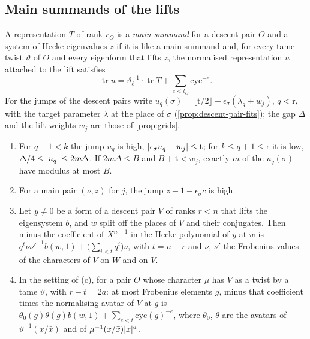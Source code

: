 \subsection{Main summands of the lifts}\label{ss:main-summands-lifts}
A representation $T$ of rank $r_O$ is a \emph{main summand} for a descent pair $O$ and a system of Hecke eigenvalues $z$ if it is like a main summand and, for every tame twist $\vartheta$ of $O$ and every eigenform that lifts
$z$, the normalised representation $u$ attached to the lift satisfies
\[
  \operatorname{tr}u=\vartheta^{-1}_\ell\cdot\operatorname{tr}T+\sum_{e<t_O}\mathrm{cyc}^{-e}.
\]
For the jumps of the descent pairs write $u_q(\sigma)=\lfloor\mathrm t/2\rfloor-\epsilon_\sigma(\lambda_q+w_j)$, $q<\mathrm r$, with the target parameter $\lambda$ at the place of $\sigma$ (\cref{prop:descent-pair-fits}); the gap $\Delta$ and the lift weights $w_j$
are those of \cref{prop:grids}.

\begin{lemma}\label{lem:lift-jumps}
\begin{enumerate}[label=\textup{(\alph*)}]
\item For $q+1<k$ the jump $u_q$ is high, $\lvert \epsilon_\sigma u_q+w_j\rvert\le\mathrm t$; for $k\le q+1\le\mathrm r$ it is low, $\Delta/4\le\lvert u_q\rvert\le2m\Delta$. If $2m\Delta\le B$ and $B+\mathrm t<w_j$, exactly $m$ of the $u_q(\sigma)$ have modulus at most $B$.
\item For a main pair $(\nu,z)$ for $j$, the jump $z-1-\epsilon_\sigma c$ is high.
\item Let $y\ne0$ be a form of a descent pair $V$ of ranks $r<n$ that lifts the eigensystem $b$, and $w$ split off the places of $V$ and their conjugates. Then minus the coefficient of $X^{n-1}$ in the Hecke polynomial of $y$ at
$w$ is $q^t\nu\nu'^{-1}b(w,1)+\bigl(\sum_{i<t}q^i\bigr)\nu$, with $t=n-r$ and $\nu$, $\nu'$ the Frobenius values of the characters of $V$ on $W$ and on $V$.
\item In the setting of (c), for a pair $O$ whose character $\mu$ has $V$ as a twist by a tame $\vartheta$, with $r-t=2a$: at most Frobenius elements $g$, minus that coefficient times the normalising avatar of $V$ at $g$ is
$\theta_0(g)\theta(g)b(w,1)+\sum_{e<t}\mathrm{cyc}(g)^{-e}$, where $\theta_0$, $\theta$ are the avatars of $\vartheta^{-1}(x/\bar x)$ and of $\mu^{-1}(x/\bar x)\lvert x\rvert^a$.
\end{enumerate}
\end{lemma}

